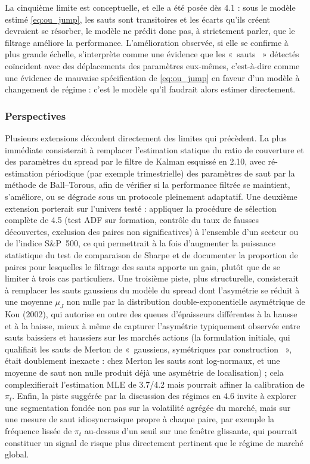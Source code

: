 \documentclass{article}
\providecommand{\og}{«~}
\providecommand{\fg}{~»}
\begin{document}
La cinquième limite est conceptuelle, et elle a été posée dès 4.1 : sous le modèle estimé \eqref{eq:ou_jump}, les sauts sont transitoires et les écarts qu'ils créent devraient se résorber, le modèle ne prédit donc pas, à strictement parler, que le filtrage améliore la performance. L'amélioration observée, si elle se confirme à plus grande échelle, s'interprète comme une évidence que les \og sauts \fg{} détectés coïncident avec des déplacements des paramètres eux-mêmes, c'est-à-dire comme une évidence de mauvaise spécification de \eqref{eq:ou_jump} en faveur d'un modèle à changement de régime : c'est le modèle qu'il faudrait alors estimer directement.
\subsubsection*{Perspectives}
Plusieurs extensions découlent directement des limites qui précèdent. La plus immédiate consisterait à remplacer l'estimation statique du ratio de couverture et des paramètres du spread par le filtre de Kalman esquissé en 2.10, avec ré-estimation périodique (par exemple trimestrielle) des paramètres de saut par la méthode de Ball--Torous, afin de vérifier si la performance filtrée se maintient, s'améliore, ou se dégrade sous un protocole pleinement adaptatif. Une deuxième extension porterait sur l'univers testé : appliquer la procédure de sélection complète de 4.5 (test ADF sur formation, contrôle du taux de fausses découvertes, exclusion des paires non significatives) à l'ensemble d'un secteur ou de l'indice S\&P~500, ce qui permettrait à la fois d'augmenter la puissance statistique du test de comparaison de Sharpe et de documenter la proportion de paires pour lesquelles le filtrage des sauts apporte un gain, plutôt que de se limiter à trois cas particuliers. Une troisième piste, plus structurelle, consisterait à remplacer les sauts gaussiens du modèle du spread dont l'asymétrie se réduit à une moyenne $\mu_J$ non nulle par la distribution double-exponentielle asymétrique de Kou (2002), qui autorise en outre des queues d'épaisseurs différentes à la hausse et à la baisse, mieux à même de capturer l'asymétrie typiquement observée entre sauts baissiers et haussiers sur les marchés actions (la formulation initiale, qui qualifiait les sauts de Merton de \og gaussiens, symétriques par construction \fg, était doublement inexacte : chez Merton les sauts sont log-normaux, et une moyenne de saut non nulle produit déjà une asymétrie de localisation) ; cela complexifierait l'estimation MLE de 3.7/4.2 mais pourrait affiner la calibration de $\pi_t$. Enfin, la piste suggérée par la discussion des régimes en 4.6 invite à explorer une segmentation fondée non pas sur la volatilité agrégée du marché, mais sur une mesure de saut idiosyncrasique propre à chaque paire, par exemple la fréquence lissée de $\pi_t$ au-dessus d'un seuil sur une fenêtre glissante, qui pourrait constituer un signal de risque plus directement pertinent que le régime de marché global.
\end{document}
